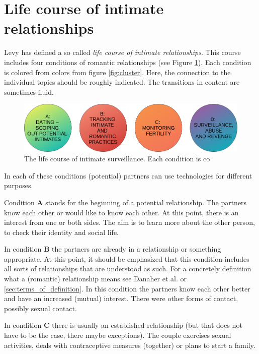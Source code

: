 \section{Life course of intimate relationships}
\label{sec:life_course}
Levy \cite{levy2014intimate} has defined a so called \textit{life course of intimate relationships}. This course includes four conditions of romantic relationships (see Figure \ref{fig:live_course}). Each condition is colored from colors from figure \ref{fig:cluster}. Here, the connection to the individual topics should be roughly indicated. The transitions in content are sometimes fluid.
\begin{figure}[htb]
    \centering
	\includegraphics[width=\linewidth]{img/life_course_of_intimate_surveillance.png}
	\caption{The life course of intimate surveillance. Each condition is co}
	\label{fig:live_course}
\end{figure}

In each of these conditions (potential) partners can use technologies for different purposes.

Condition \textbf{A} stands for the beginning of a potential relationship. The partners know each other or would like to know each other. At this point, there is an interest from one or both sides. The aim is to learn more about the other person, to check their identity and social life.

In condition \textbf{B} the partners are already in a relationship or something appropriate. At this point, it should be emphasized that this condition includes all sorts of relationships that are understood as such. For a concretely definition what a (romantic) relationship means see Danaher et al. \cite{doi:10.1080/15265161.2017.1409823} or \ref{sec:terms_of_definition}. In this condition the partners know each other better and have an increased (mutual) interest. There were other forms of contact, possibly sexual contact.

In condition \textbf{C} there is usually an established relationship (but that does not have to be the case, there maybe exceptions). The couple exercises sexual activities, deals with contraceptive measures (together) or plans to start a family.

